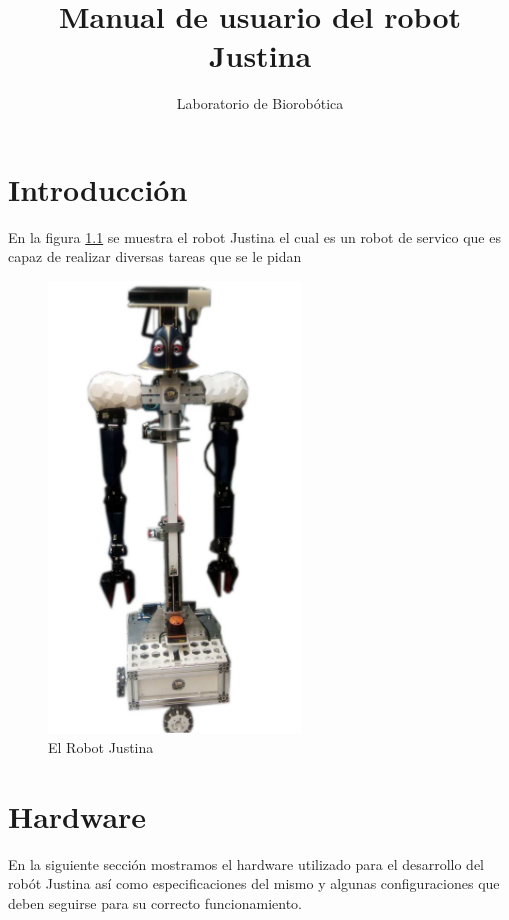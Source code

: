 \documentclass[a4paper]{book}
\title{Manual de usuario del robot Justina}
\author{Laboratorio de Biorobótica}
\begin{document}
\maketitle

\tableofcontents

\chapter{Introducción}
En la figura \ref{fig:introduction:Justina} se muestra el robot Justina el cual es un robot de servico que es capaz de realizar diversas tareas que se le pidan

\begin{figure}
\centering
\includegraphics[width=0.6\textwidth]{Figures/Introduction/Justina.png}
\caption{El Robot Justina}
\label{fig:introduction:Justina}
\end{figure}

\chapter{Hardware}
En la siguiente sección mostramos el hardware utilizado para el desarrollo del robót Justina así como especificaciones del mismo y algunas configuraciones que deben seguirse para su correcto funcionamiento.
\end{document}
